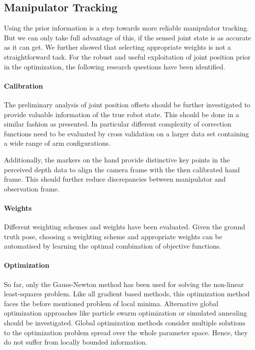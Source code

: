 \subsection{Manipulator Tracking}

Using the prior information is a step towards more reliable manipulator tracking. But we can only take full advantage of this, if the sensed joint state is as accurate as it can get. We further showed that selecting appropriate weights is not a straightforward task.
For the robust and useful exploitation of joint position prior in the optimization, the following research questions have been identified.

\vspace{-0.04cm}

\paragraph{Calibration}
The preliminary analysis of joint position offsets should be further investigated to provide valuable information of the true robot state. This should be done in a similar fashion as presented. In particular different complexity of correction functions need to be evaluated by cross validation on a larger data set containing a wide range of arm configurations.

Additionally, the markers on the hand provide distinctive key points in the perceived depth data to align the camera frame with the then calibrated hand frame. This should further reduce discrepancies between manipulator and observation frame.

\vspace{-0.04cm}

\paragraph{Weights}
Different weighting schemes and weights have been evaluated. Given the ground truth pose, choosing a weighting scheme and appropriate weights can be automatised by learning the optimal combination of objective functions.

\vspace{-0.04cm}

\paragraph{Optimization}
So far, only the Gauss-Newton method has been used for solving the non-linear least-squares problem. Like all gradient based methods, this optimization method faces the before mentioned problem of local minima. Alternative global optimization approaches like particle swarm optimization or simulated annealing should be investigated. Global optimization methods consider multiple solutions to the optimization problem spread over the whole parameter space. Hence, they do not suffer from locally bounded information.


